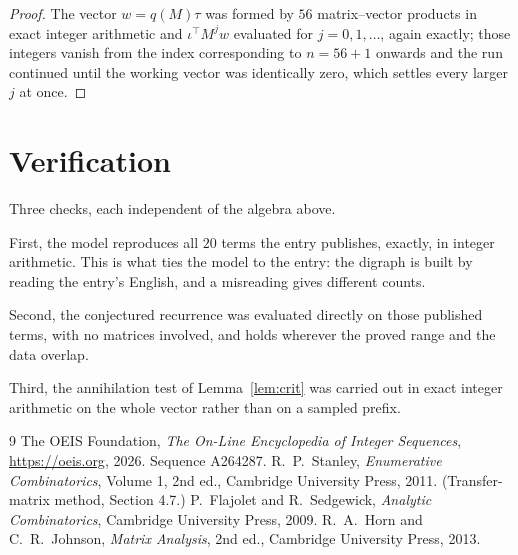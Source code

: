\documentclass[11pt,a4paper]{article}
\theoremstyle{plain}
\theoremstyle{definition}
\begin{document}
\begin{proof}
The vector $w=q(M)\tau$ was formed by $56$ matrix--vector products in exact integer
arithmetic and $\iota^{\!\top}M^{j}w$ evaluated for $j=0,1,\dots$, again exactly; those
integers vanish from the index corresponding to $n=56+1$ onwards and the run continued
until the working vector was identically zero, which settles every larger $j$ at once.
\end{proof}

\section{Verification}

Three checks, each independent of the algebra above.

First, the model reproduces all $20$ terms the entry publishes, exactly, in integer
arithmetic. This is what ties the model to the entry: the digraph is built by reading the
entry's English, and a misreading gives different counts.

Second, the conjectured recurrence was evaluated directly on those published terms, with no
matrices involved, and holds wherever the proved range and the data overlap.

Third, the annihilation test of Lemma~\ref{lem:crit} was carried out in exact integer
arithmetic on the whole vector rather than on a sampled prefix.

\begin{thebibliography}{9}
 The OEIS Foundation, \emph{The On-Line Encyclopedia of Integer
Sequences}, \url{https://oeis.org}, 2026. Sequence A264287.
 R.~P.~Stanley, \emph{Enumerative Combinatorics}, Volume 1, 2nd ed.,
Cambridge University Press, 2011. (Transfer-matrix method, Section 4.7.)
 P.~Flajolet and R.~Sedgewick, \emph{Analytic Combinatorics}, Cambridge
University Press, 2009.
 R.~A.~Horn and C.~R.~Johnson, \emph{Matrix Analysis}, 2nd ed., Cambridge
University Press, 2013.
\end{thebibliography}
\end{document}
